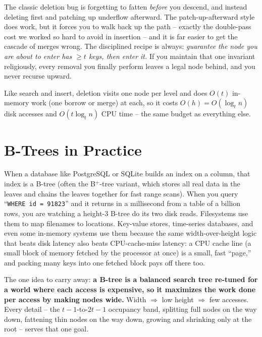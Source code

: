 \begin{trapbox}
The classic deletion bug is forgetting to fatten \emph{before} you descend, and
instead deleting first and patching up underflow afterward. The patch-up-afterward
style does work, but it forces you to walk back up the path -- exactly the
double-pass cost we worked so hard to avoid in insertion -- and it is far easier to
get the cascade of merges wrong. The disciplined recipe is always: \emph{guarantee
the node you are about to enter has $\ge t$ keys, then enter it.} If you maintain
that one invariant religiously, every removal you finally perform leaves a legal
node behind, and you never recurse upward.
\end{trapbox}

Like search and insert, deletion visits one node per level and does $O(t)$
in-memory work (one borrow or merge) at each, so it costs $O(h) = O(\log_t n)$ disk
accesses and $O(t\log_t n)$ CPU time -- the same budget as everything else.

\section{B-Trees in Practice}

\begin{aestheticbox}
When a database like PostgreSQL or SQLite builds an
index on a column, that index is a B-tree (often the B$^+$-tree variant, which
stores all real data in the leaves and chains the leaves together for fast range
scans). When you query
``\texttt{WHERE id = 91823}'' and it returns in a millisecond from a table of a
billion rows, you are watching a height-$3$ B-tree do its two disk reads.
Filesystems use them to map filenames to locations. Key-value stores, time-series
databases, and even some in-memory systems use them because the same width-over-height
logic that beats disk latency also beats CPU-cache-miss latency: a CPU cache line (a small block of memory fetched by the processor at once) is a small, fast ``page,'' and packing many keys into one
fetched block pays off there too.
\end{aestheticbox}

\begin{focusbox}
The one idea to carry away: \textbf{a B-tree is a balanced search tree re-tuned for a
world where each access is expensive, so it maximizes the work done per access by
making nodes wide.} Width $\Rightarrow$ low height $\Rightarrow$ few accesses. Every
detail -- the $t-1$-to-$2t-1$ occupancy band, splitting full nodes on the way down,
fattening thin nodes on the way down, growing and shrinking only at the root -- serves
that one goal.
\end{focusbox}


